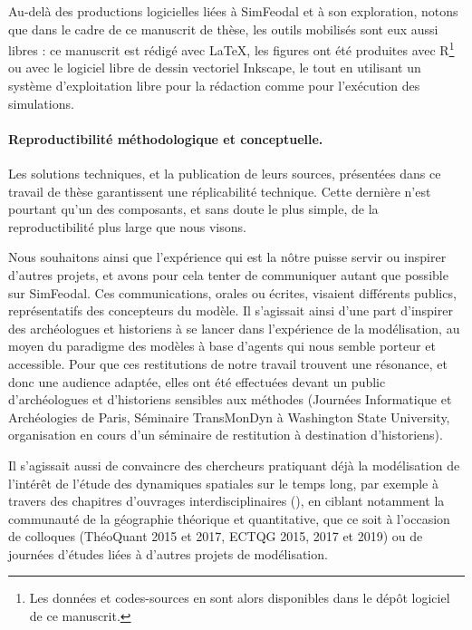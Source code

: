 Au-delà des productions \og logicielles\fg{} liées à SimFeodal et à son exploration, notons que dans le cadre de ce manuscrit de thèse, les outils mobilisés sont eux aussi libres : ce manuscrit est rédigé avec \LaTeX, les figures ont été produites avec R\footnote{
	Les données et codes-sources en sont alors disponibles dans le dépôt logiciel de ce manuscrit.
} ou avec le logiciel libre de dessin vectoriel Inkscape, le tout en utilisant un système d'exploitation libre pour la rédaction comme pour l'exécution des simulations.

\paragraph{Reproductibilité méthodologique et conceptuelle.}

Les solutions techniques, et la publication de leurs sources, présentées dans ce travail de thèse garantissent une réplicabilité technique.
Cette dernière n'est pourtant qu'un des composants, et sans doute le plus simple, de la reproductibilité plus large que nous visons.

Nous souhaitons ainsi que l'expérience qui est la nôtre puisse servir ou inspirer d'autres projets, et avons pour cela tenter de communiquer autant que possible sur SimFeodal.
Ces communications, orales ou écrites, visaient différents publics, représentatifs des concepteurs du modèle.
Il s'agissait ainsi d'une part d'inspirer des archéologues et historiens à se lancer dans l'expérience de la modélisation, au moyen du paradigme des modèles à base d'agents qui nous semble porteur et accessible.
Pour que ces restitutions de notre travail trouvent une résonance, et donc une audience adaptée, elles ont été effectuées devant un public d'archéologues et d'historiens sensibles aux méthodes (Journées Informatique et Archéologies de Paris, Séminaire TransMonDyn à Washington State University, organisation en cours d'un séminaire de restitution à destination d'historiens).

Il s'agissait aussi de convaincre des chercheurs pratiquant déjà la modélisation de l'intérêt de l'étude des dynamiques spatiales sur le temps long, par exemple à travers des chapitres d'ouvrages interdisciplinaires (\autocite{tannier_ontologie_2014,cura_transition_2017}), en ciblant notamment la communauté de la géographie théorique et quantitative, que ce soit à l'occasion de colloques (ThéoQuant 2015 et 2017, ECTQG 2015, 2017 et 2019) ou de journées d'études liées à d'autres projets de modélisation.

